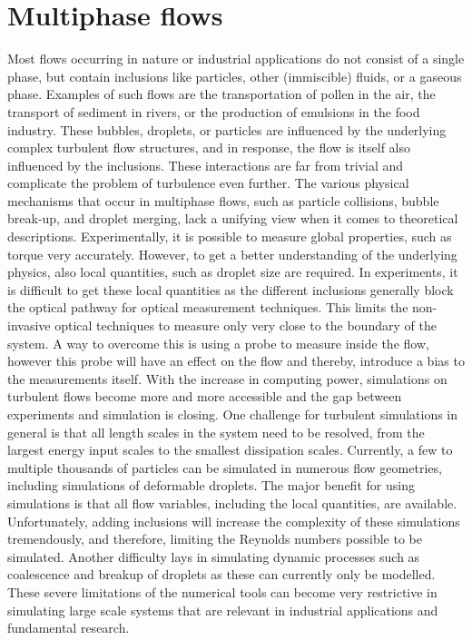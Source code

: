 \section*{Multiphase flows}
Most flows occurring in nature or industrial applications do not consist of a
single phase, but contain inclusions like particles, other (immiscible)
fluids, or a gaseous phase. Examples of such flows are the transportation of
pollen in the air, the transport of sediment in rivers, or the production of
emulsions in the food industry. These bubbles, droplets, or particles are
influenced by the underlying complex turbulent flow structures, and in
response, the flow is itself also influenced by the inclusions. These
interactions are far from trivial and complicate the problem of turbulence
even further. The various physical mechanisms that occur in multiphase flows,
such as particle collisions, bubble break-up, and droplet merging, lack a
unifying view when it comes to theoretical descriptions. Experimentally, it is
possible to measure global properties, such as torque very accurately.
However, to get a better understanding of the underlying physics, also local
quantities, such as droplet size are required. In experiments, it is difficult
to get these local quantities as the different inclusions generally block the
optical pathway for optical measurement techniques. This limits the
non-invasive optical techniques to measure only very close to the boundary of
the system. A way to overcome this is using a probe to measure inside the
flow, however this probe will have an effect on the flow and thereby,
introduce a bias to the measurements itself.  With the increase in computing
power, simulations on turbulent flows become more and more accessible and the
gap between experiments and simulation is closing.  One challenge for
turbulent simulations in general is that all length scales in the system need
to be resolved, from the largest energy input scales to the smallest
dissipation scales. Currently, a few to multiple thousands of particles can be
simulated in numerous flow geometries, including simulations of deformable
droplets\citep{Spandan2018}. The major benefit for using simulations is that
all flow variables, including the local quantities, are available.
Unfortunately, adding inclusions will increase the complexity of these
simulations tremendously, and therefore, limiting the Reynolds numbers
possible to be simulated. Another difficulty lays in simulating dynamic
processes such as coalescence and breakup of droplets as these can currently
only be modelled. These severe limitations of the numerical tools can become
very restrictive in simulating large scale systems that are relevant in
industrial applications and fundamental research.
\newpage
